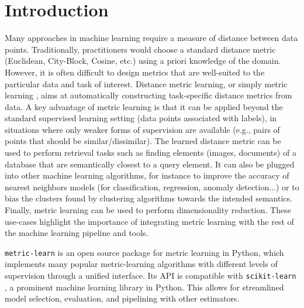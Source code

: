 \documentclass[twoside,11pt]{article}
\begin{document}
\section{Introduction}

Many approaches in machine learning require a measure of distance between data
points. Traditionally, practitioners would choose a standard distance metric
(Euclidean, City-Block, Cosine, etc.) using a priori knowledge of the
domain. However, it is often difficult to design metrics that are well-suited
to the particular data and task of interest.
Distance metric learning, or simply metric learning \citep{Bellet15}, aims at
automatically constructing task-specific distance metrics from data. A key advantage of metric learning is that it can be applied beyond the standard supervised learning setting (data points associated with labels), in situations where only weaker forms of supervision are available (e.g., pairs of points that should be similar/dissimilar). The learned distance metric can be used to perform retrieval tasks such as finding elements (images, documents) of a database that are semantically closest to a query element. It can also be plugged into other machine learning algorithms, for instance to improve the accuracy of nearest neighbors models (for classification, regression, anomaly detection...) or to bias the clusters found by clustering algorithms towards the intended semantics. Finally, metric learning can be used to perform dimensionality reduction.
These use-cases highlight the importance of integrating metric learning with the rest of the machine learning pipeline and tools.

\texttt{metric-learn} is an open source package for metric learning in Python, which implements many popular metric-learning algorithms with different levels of supervision through a unified interface.
Its API is compatible with \texttt{scikit-learn} \citep{scikit-learn}, a prominent machine learning library in Python. This allows for streamlined model selection, evaluation, and pipelining with other estimators.
\end{document}
